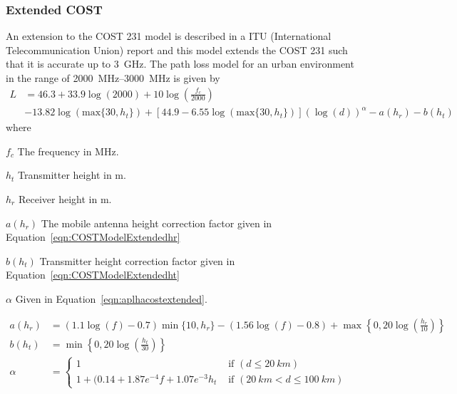 \subsubsection{Extended COST}
An extension to the COST 231 model is described in a ITU (International Telecommunication Union) report \cite{itu2002report} and this model extends the COST 231 such that it is accurate up to \SI{3}{GHz}. The path loss model for an urban environment in the range of \SIrange{2000}{3000}{MHz} is given by \cite{itu2002report}
\begin{equation} 
\label{eqn:COSTModelExtended}
\begin{aligned}
    L &= 46.3 + 33.9 \log(2000) + 10 \log\left(\frac{f_c}{2000}\right) \\
        &- 13.82 \log(\text{max}\{30,h_t\}) + [44.9 -6.55 \log(\text{max}\{30,h_t\})] (\log(d))^{\alpha} - a(h_r) - b(h_t)
\end{aligned}
\end{equation} 
where 
\begin{where}
\item [$f_c$] The frequency in \si{MHz}.
\item [$h_t$] Transmitter height in \si{m}. 
\item [$h_r$] Receiver height in \si{m}.
\item [$a(h_r)$] The mobile antenna height correction factor given in Equation~\ref{eqn:COSTModelExtendedhr}
\item [$b(h_t)$] Transmitter height correction factor given in Equation~\ref{eqn:COSTModelExtendedht}
\item [$\alpha$] Given in Equation~\ref{eqn:aplhacostextended}.
\end{where}
\begin{align} 
\label{eqn:COSTModelExtendedhr}
a(h_r)&=(1.1\log(f)-0.7) \min\{10,h_r\}-(1.56\log(f)-0.8)+\max\left\{0,20\log\left(\frac{h_r}{10}\right)\right\}\\
\label{eqn:COSTModelExtendedht}
b(h_t)&= \min\left\{0,20\log\left(\frac{h_t}{30}\right)\right\}\\
\label{eqn:aplhacostextended}
\alpha &= 
  \begin{cases}
      1 & \text{ if } (d \leq \SI{20}{km}) \\
    1+(0.14+1.87e^{-4} f + 1.07e^{-3} h_t & \text{ if } (\SI{20}{km} < d \leq \SI{100}{km})
  \end{cases}
\end{align} 
